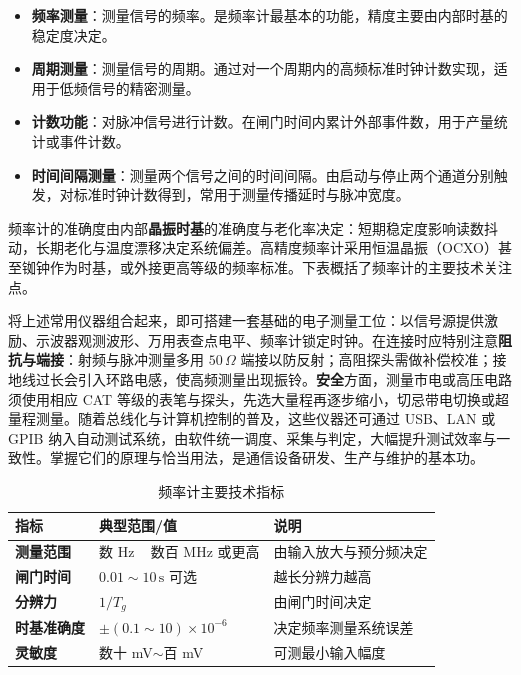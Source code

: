 \begin{itemize}
    \item \textbf{频率测量}：测量信号的频率。是频率计最基本的功能，精度主要由内部时基的稳定度决定。
    \item \textbf{周期测量}：测量信号的周期。通过对一个周期内的高频标准时钟计数实现，适用于低频信号的精密测量。
    \item \textbf{计数功能}：对脉冲信号进行计数。在闸门时间内累计外部事件数，用于产量统计或事件计数。
    \item \textbf{时间间隔测量}：测量两个信号之间的时间间隔。由启动与停止两个通道分别触发，对标准时钟计数得到，常用于测量传播延时与脉冲宽度。
\end{itemize}

频率计的准确度由内部\textbf{晶振时基}的准确度与老化率决定：短期稳定度影响读数抖动，长期老化与温度漂移决定系统偏差。高精度频率计采用恒温晶振（OCXO）甚至铷钟作为时基，或外接更高等级的频率标准。下表概括了频率计的主要技术关注点。

将上述常用仪器组合起来，即可搭建一套基础的电子测量工位：以信号源提供激励、示波器观测波形、万用表查点电平、频率计锁定时钟。在连接时应特别注意\textbf{阻抗与端接}：射频与脉冲测量多用 $50\,\Omega$ 端接以防反射；高阻探头需做补偿校准；接地线过长会引入环路电感，使高频测量出现振铃。\textbf{安全}方面，测量市电或高压电路须使用相应 CAT 等级的表笔与探头，先选大量程再逐步缩小，切忌带电切换或超量程测量。随着总线化与计算机控制的普及，这些仪器还可通过 USB、LAN 或 GPIB 纳入自动测试系统，由软件统一调度、采集与判定，大幅提升测试效率与一致性。掌握它们的原理与恰当用法，是通信设备研发、生产与维护的基本功。

\begin{table}[htbp]
    \centering
    \caption{频率计主要技术指标}
    \begin{tabular}{|p{3.4cm}|p{4.8cm}|p{5.8cm}|}
        \hline
        \textbf{指标} & \textbf{典型范围/值} & \textbf{说明} \\
        \hline
        \textbf{测量范围} & 数 Hz ~ 数百 MHz 或更高 & 由输入放大与预分频决定 \\
        \hline
        \textbf{闸门时间} & $0.01\sim10\,\mathrm{s}$ 可选 & 越长分辨力越高 \\
        \hline
        \textbf{分辨力} & $1/T_g$ & 由闸门时间决定 \\
        \hline
        \textbf{时基准确度} & $\pm(0.1\sim10)\times10^{-6}$ & 决定频率测量系统误差 \\
        \hline
        \textbf{灵敏度} & 数十 mV$\sim$百 mV & 可测最小输入幅度 \\
        \hline
    \end{tabular}
\end{table}
